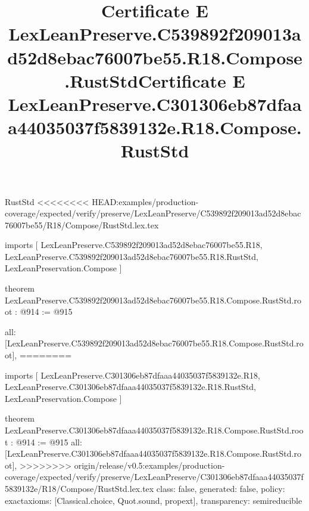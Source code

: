 \begin{lexlean}{RustStd}
<<<<<<<< HEAD:examples/production-coverage/expected/verify/preserve/LexLeanPreserve/C539892f209013ad52d8ebac76007be55/R18/Compose/RustStd.lex.tex
\title{Certificate E LexLeanPreserve.C539892f209013ad52d8ebac76007be55.R18.Compose.RustStd}
\begin{coremodule}
imports [
  LexLeanPreserve.C539892f209013ad52d8ebac76007be55.R18,
  LexLeanPreserve.C539892f209013ad52d8ebac76007be55.R18.RustStd,
  LexLeanPreservation.Compose
]

theorem LexLeanPreserve.C539892f209013ad52d8ebac76007be55.R18.Compose.RustStd.root : @914 := @915 {
  all: [LexLeanPreserve.C539892f209013ad52d8ebac76007be55.R18.Compose.RustStd.root],
========
\title{Certificate E LexLeanPreserve.C301306eb87dfaaa44035037f5839132e.R18.Compose.RustStd}
\begin{coremodule}
imports [
  LexLeanPreserve.C301306eb87dfaaa44035037f5839132e.R18,
  LexLeanPreserve.C301306eb87dfaaa44035037f5839132e.R18.RustStd,
  LexLeanPreservation.Compose
]

theorem LexLeanPreserve.C301306eb87dfaaa44035037f5839132e.R18.Compose.RustStd.root : @914 := @915 {
  all: [LexLeanPreserve.C301306eb87dfaaa44035037f5839132e.R18.Compose.RustStd.root],
>>>>>>>> origin/release/v0.5:examples/production-coverage/expected/verify/preserve/LexLeanPreserve/C301306eb87dfaaa44035037f5839132e/R18/Compose/RustStd.lex.tex
  class: false,
  generated: false,
  policy: exact{axioms: [Classical.choice, Quot.sound, propext]},
  transparency: semireducible
}


\end{coremodule}}
\end{coremodule}
\end{lexlean}
